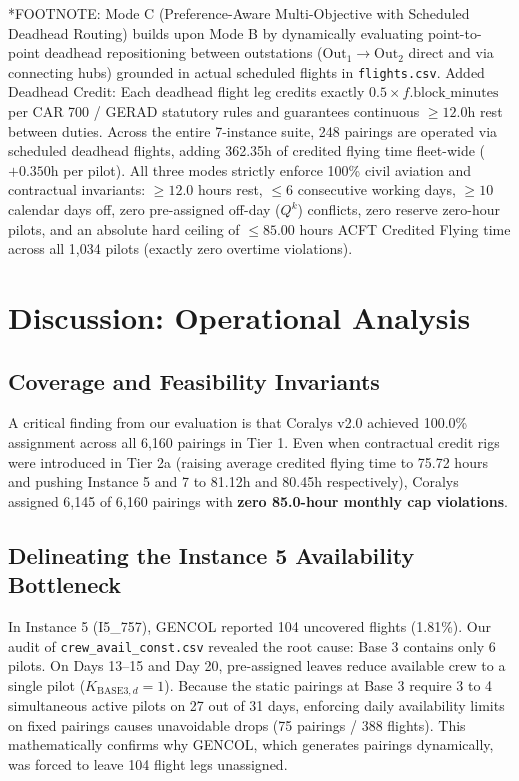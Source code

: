\documentclass[journal]{IEEEtran}
\begin{document}
\begin{table}[t]
{\begin{tabular}{lrrrrrrrrrrrrrrr}
\bottomrule
\end{tabular}%
}
\begin{flushleft}
\footnotesize
*FOOTNOTE: Mode C (Preference-Aware Multi-Objective with Scheduled Deadhead Routing) builds upon Mode B by dynamically evaluating point-to-point deadhead repositioning between outstations ($\text{Out}_1 \to \text{Out}_2$ direct and via connecting hubs) grounded in actual scheduled flights in \texttt{flights.csv}. Added Deadhead Credit: Each deadhead flight leg credits exactly $0.5 \times f.\text{block\_minutes}$ per CAR 700 / GERAD statutory rules and guarantees continuous $\ge 12.0$h rest between duties. Across the entire 7-instance suite, 248 pairings are operated via scheduled deadhead flights, adding 362.35h of credited flying time fleet-wide ($+0.350$h per pilot). All three modes strictly enforce 100\% civil aviation and contractual invariants: $\ge 12.0$ hours rest, $\le 6$ consecutive working days, $\ge 10$ calendar days off, zero pre-assigned off-day ($Q^k$) conflicts, zero reserve zero-hour pilots, and an absolute hard ceiling of $\le 85.00$ hours ACFT Credited Flying time across all 1,034 pilots (exactly zero overtime violations).
\end{flushleft}
\end{table}

\section{Discussion: Operational Analysis}

\subsection{Coverage and Feasibility Invariants}

A critical finding from our evaluation is that Coralys v2.0 achieved 100.0\% assignment across all 6,160 pairings in Tier 1. Even when contractual credit rigs were introduced in Tier 2a (raising average credited flying time to 75.72 hours and pushing Instance 5 and 7 to 81.12h and 80.45h respectively), Coralys assigned 6,145 of 6,160 pairings with \textbf{zero 85.0-hour monthly cap violations}.

\subsection{Delineating the Instance 5 Availability Bottleneck}

In Instance 5 (I5\_757), GENCOL reported 104 uncovered flights (1.81\%). Our audit of \texttt{crew\_avail\_const.csv} revealed the root cause: Base 3 contains only 6 pilots. On Days 13--15 and Day 20, pre-assigned leaves reduce available crew to a single pilot ($K_{\text{BASE3}, d} = 1$). Because the static pairings at Base 3 require 3 to 4 simultaneous active pilots on 27 out of 31 days, enforcing daily availability limits on fixed pairings causes unavoidable drops (75 pairings / 388 flights). This mathematically confirms why GENCOL, which generates pairings dynamically, was forced to leave 104 flight legs unassigned.
\end{document}
